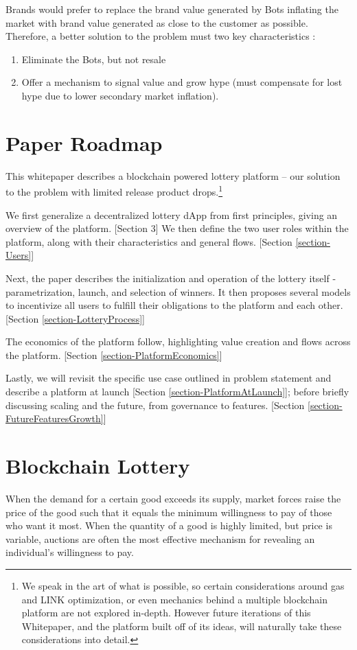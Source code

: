 \documentclass[runningheads]{llncs}
\begin{document}
Brands would prefer to replace the brand value generated by Bots inflating the market with brand value generated as close to the customer as possible.  Therefore, a better solution to the problem must two key characteristics :
\begin{enumerate}
\item Eliminate the Bots, but not resale
\item Offer a mechanism to signal value and grow hype (must compensate for lost hype due to lower secondary market inflation).
\end{enumerate}


\section{Paper Roadmap}\label{PaperRoadmap}
This whitepaper describes a blockchain powered lottery platform – our solution to the problem with limited release product drops.\footnote{We speak in the art of what is possible, so certain considerations around gas and LINK optimization, or even mechanics behind a multiple blockchain platform are not explored in-depth.  However future iterations of this Whitepaper, and the platform built off of its ideas, will naturally take these considerations into detail.}  

We first generalize a decentralized lottery dApp from first principles, giving an overview of the platform. [Section 3]  We then define the two user roles within the platform, along with their characteristics and general flows. [Section \ref{section-Users}]

Next, the paper describes the initialization and operation of the lottery itself -  parametrization, launch, and selection of winners.  It then proposes several models to incentivize all users to  fulfill their obligations to the platform and each other.  [Section \ref{section-LotteryProcess}]

The economics of the platform follow, highlighting value creation and flows across the platform.  [Section \ref{section-PlatformEconomics}]  

Lastly, we will revisit the specific use case outlined in problem statement and describe a platform at launch [Section \ref{section-PlatformAtLaunch}]; before briefly discussing scaling and the future, from governance to features.  [Section \ref{section-FutureFeaturesGrowth}]



\section{Blockchain Lottery}
When the demand for a certain good exceeds its supply, market forces raise the price of the good such that it equals the minimum willingness to pay of those who want it most.  When the quantity of a good is highly limited, but price is variable, auctions are often the most effective mechanism for revealing an individual’s willingness to pay.
\end{document}
